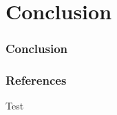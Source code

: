 \documentclass{beamer}
\begin{document}
\section{Conclusion}
\begin{frame}
\frametitle{Conclusion}
\end{frame}

\begin{frame}
\frametitle{References}
Test\cite{library7291}


\end{frame}
\end{document}
